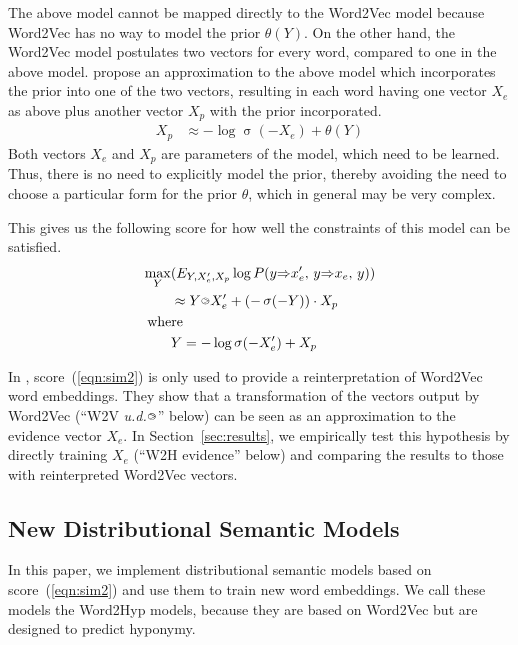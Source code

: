 \documentclass[11pt,a4paper]{article}
\DeclareMathOperator*{\simm}{sim}
\DeclareMathOperator*{\sig}{\sigma}
\newcommand{\entail}{{\Rightarrow}}
\newcommand{\bie}{{\raisebox{1.8pt}{\makebox[0pt][l]{\hspace{1.3pt}${\scriptscriptstyle >}$}${\scriptscriptstyle \bigcirc}$}}}
\begin{document}
The above model cannot be mapped directly to the Word2Vec model because
Word2Vec has no way to model the prior $\theta(Y)$.  On the other hand, the
Word2Vec model postulates two vectors for every word, compared to one in the
above model.  \citet{Henderson16_acl} propose an approximation to the above
model which incorporates the prior into one of the two vectors, resulting in
each word having one vector $X_e$ as above plus another vector $X_p$
with the prior incorporated.
\begin{align}
  X_p &\approx  {-}\log\sig({-}X_e) + \theta(Y) 
  \label{eqn:xp}
\end{align}
Both vectors $X_e$ and $X_p$ are parameters of the model, which need to be
learned.  Thus, there is no need to explicitly model the prior, thereby
avoiding the need to choose a particular form for the prior $\theta$, which in
general may be very complex.

This gives us the following score for how well the constraints of this model
can be satisfied.
\begin{align}
  \max_Y&(E_{Y,X^\prime_e,X_p} \log P(y\entail x^\prime_e,\,y\entail x_e,\,y) )
  \nonumber
  \\
  &\approx
    Y\bie X^\prime_e + ({-}\sig({-}Y))\cdot X_p
  \label{eqn:sim2}
  \\
  \mbox{where}\hspace{-2ex}&
  \nonumber
  \\& %
  Y =  - \log\sig({-}X^\prime_e) + X_p
  \label{eqn:inf2}
\end{align}


In \citep{Henderson16_acl}, score~(\ref{eqn:sim2}) is only used to provide a
reinterpretation of Word2Vec word embeddings.  They show that a transformation
of the vectors output by Word2Vec (``W2V {\em u.d.$\bie$}'' below) can be seen
as an approximation to the evidence vector $X_e$.  In
Section~\ref{sec:results}, we empirically test this hypothesis by directly
training $X_e$ (``W2H evidence'' below) and comparing the results to those
with reinterpreted Word2Vec vectors.





\subsection{New Distributional Semantic Models}

In this paper, we implement distributional semantic models based on
score~(\ref{eqn:sim2}) and use them to train new word embeddings.
We call these models the
Word2Hyp models, because they are based on Word2Vec but are designed to
predict hyponymy.  
\end{document}
